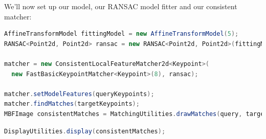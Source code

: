 We'll now set up our model, our RANSAC model fitter and our consistent matcher:
\begin{lstlisting}[language=java]
AffineTransformModel fittingModel = new AffineTransformModel(5);
RANSAC<Point2d, Point2d> ransac = new RANSAC<Point2d, Point2d>(fittingModel, 1500, new RANSAC.PercentageInliersStoppingCondition(0.5), true);

matcher = new ConsistentLocalFeatureMatcher2d<Keypoint>(
  new FastBasicKeypointMatcher<Keypoint>(8), ransac);

matcher.setModelFeatures(queryKeypoints);
matcher.findMatches(targetKeypoints);
MBFImage consistentMatches = MatchingUtilities.drawMatches(query, target, matcher.getMatches(), RGBColour.RED);
\end{lstlisting}
\begin{lstlisting}[language=java]
DisplayUtilities.display(consistentMatches);
\end{lstlisting}
